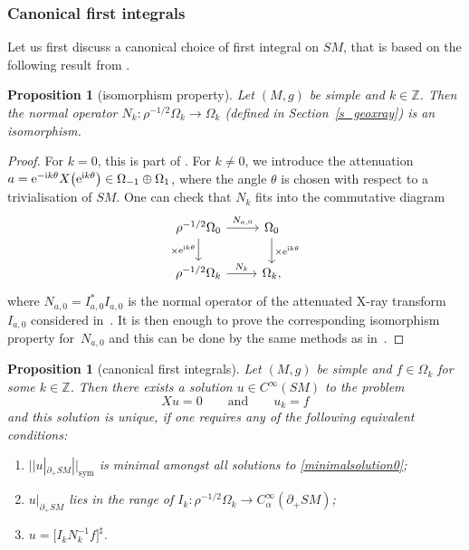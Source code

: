 \documentclass[pdftex]{sigma}
\numberwithin{equation}{section}
\newtheorem{Proposition}[Theorem]{Proposition}
\theoremstyle{definition}
\newcommand{\Z}{\mathbb{Z}} %
\newcommand{\1}{{\bf 1}}
\begin{document}
\subsubsection{Canonical first integrals}
 Let us first discuss a canonical choice of first integral on $SM$, that is based on the following result from \cite{MNP19a}.

\begin{Proposition}[isomorphism property]\label{prop_isonk}
	Let $(M,g)$ be simple and $k\in \Z$. Then the normal operator $N_k\colon \rho^{-1/2}\Omega_k\to \Omega_k$ {\rm(}defined in Section~{\rm\ref{s_geoxray})} is an isomorphism.
\end{Proposition}

\begin{proof}
For $k=0$, this is part of \cite[Theorem 2.2]{MNP19a}. For $k\neq 0$, we introduce the attenuation $a= {\rm e}^{-{\rm i}k\theta} X\bigl({\rm e}^{{\rm i}k\theta}\bigr)\in \Omega_{-1}\oplus\Omega_1$, where the angle $\theta$ is chosen with respect to a trivialisation of $SM$. One can check that $N_k$ fits into the commutative diagram
\[
	\begin{tikzcd}
		\rho^{-1/2}\Omega_0 \arrow["N_{a,0}"]{r} \arrow[swap,"\times {\rm e}^{{\rm i}k\theta}"]{d}& \Omega_0 \arrow["\times {\rm e}^{{\rm i}k\theta}"]{d}\\
		\rho^{-1/2}\Omega_k \arrow["N_k"]{r} & \Omega_k,
	\end{tikzcd}
\]
where $N_{a,0}=I_{a,0}^*I_{a,0}$ is the normal operator of the attenuated X-ray transform $I_{a,0}$ considered in~\cite[Section~12.2]{PSU23}. It is then enough to prove the corresponding isomorphism property for~$N_{a,0}$ and this can be done by the same methods as in~\cite{MNP19a}.
\end{proof}

\begin{Proposition}[canonical first integrals]\label{minimalsolution} Let $(M,g)$ be simple and $f\in \Omega_k$ for some $k\in \Z$. Then there exists a solution $u\in C^\infty(SM)$ to the problem
\begin{equation}\label{minimalsolution0}
		X u = 0 \qquad \text{and} \qquad u_k = f
\end{equation}
and this solution is unique, if one requires any of the following equivalent conditions:
\begin{enumerate}[label=\rm (\roman*)]\itemsep=0pt
	\item\label{minimalsolution1} $||u|_{\partial_+SM}||_{\mathrm{sym}}$ is minimal amongst all solutions to \eqref{minimalsolution0};
	
	\item\label{minimalsolution2} $u\vert_{\partial_+SM}$ lies in the range of $I_k\colon \rho^{-1/2}\Omega_k \rightarrow C_\alpha^\infty(\partial_+SM)$;
	
	\item\label{minimalsolution3} $u = \big[I_k N_k^{-1} f\big]^\sharp$.
\end{enumerate}
\end{Proposition}
\end{document}
